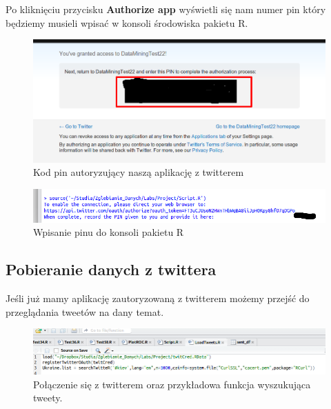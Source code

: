 \documentclass[12pt,a4paper]{report}
\begin{document}
Po kliknięciu przycisku \textbf{Authorize app} wyświetli się nam numer pin który będziemy musieli wpisać w konsoli środowiska pakietu R.
\begin{figure}[H]
\begin{center}
\includegraphics[scale=0.25]{pictures/Twitter6.png}
\caption{Kod pin autoryzujący naszą aplikację z twitterem}
\end{center}
\end{figure}

\begin{figure}[H]
\begin{center}
\includegraphics[scale=0.5]{pictures/Console1.png}
\caption{Wpisanie pinu do konsoli pakietu R}
\end{center}
\end{figure}


\subsection[Pobieranie danych z twittera]{Pobieranie danych z twittera}
Jeśli już mamy aplikację zautoryzowaną z twitterem możemy przejść do przeglądania tweetów na dany temat. 
\begin{figure}[H]
\begin{center}
\includegraphics[scale=0.5]{pictures/Code2.png}
\caption{Połączenie się z twitterem oraz przykładowa funkcja wyszukująca tweety.}
\end{center}
\end{figure}
\end{document}
